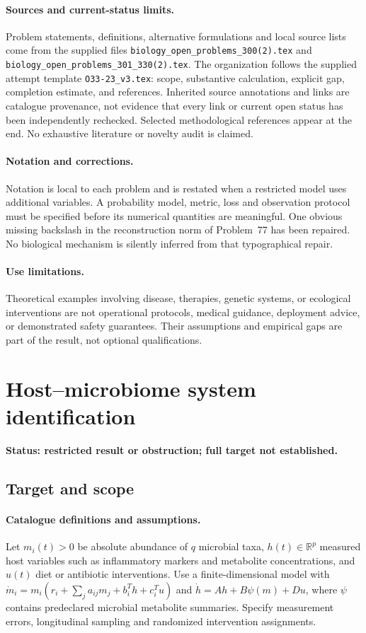 \documentclass[11pt]{article}
\begin{document}
\paragraph{Sources and current-status limits.}
Problem statements, definitions, alternative formulations and local source lists
come from the supplied files
\texttt{biology\_open\_problems\_300(2).tex} and
\texttt{biology\_open\_problems\_301\_330(2).tex}.
The organization follows the supplied attempt template
\texttt{O33-23\_v3.tex}: scope, substantive calculation, explicit gap,
completion estimate, and references. Inherited source annotations and links are
catalogue provenance, not evidence that every link or current open status has
been independently rechecked. Selected methodological references appear at the
end. No exhaustive literature or novelty audit is claimed.

\paragraph{Notation and corrections.}
Notation is local to each problem and is restated when a restricted model uses
additional variables. A probability model, metric, loss and observation protocol
must be specified before its numerical quantities are meaningful. One obvious
missing backslash in the reconstruction norm of Problem~77 has been repaired.
No biological mechanism is silently inferred from that typographical repair.

\paragraph{Use limitations.}
Theoretical examples involving disease, therapies, genetic systems, or ecological
interventions are not operational protocols, medical guidance, deployment advice,
or demonstrated safety guarantees. Their assumptions and empirical gaps are part
of the result, not optional qualifications.


\section*{Host–microbiome system identification}
\label{prob:057}
\noindent\textbf{Status: restricted result or obstruction; full target not established.}
\subsection{Target and scope}
\paragraph{Catalogue definitions and assumptions.}
Let $m_i(t)>0$ be absolute abundance of $q$ microbial taxa, $h(t)\in\mathbb{R}^p$ measured host variables such as inflammatory markers and metabolite concentrations, and $u(t)$ diet or antibiotic interventions. Use a finite-dimensional model with $\dot m_i=m_i(r_i+\sum_j a_{ij}m_j+b_i^T h+c_i^T u)$ and $\dot h=Ah+B\psi(m)+Du$, where $\psi$ contains predeclared microbial metabolite summaries. Specify measurement errors, longitudinal sampling and randomized intervention assignments.
\end{document}
